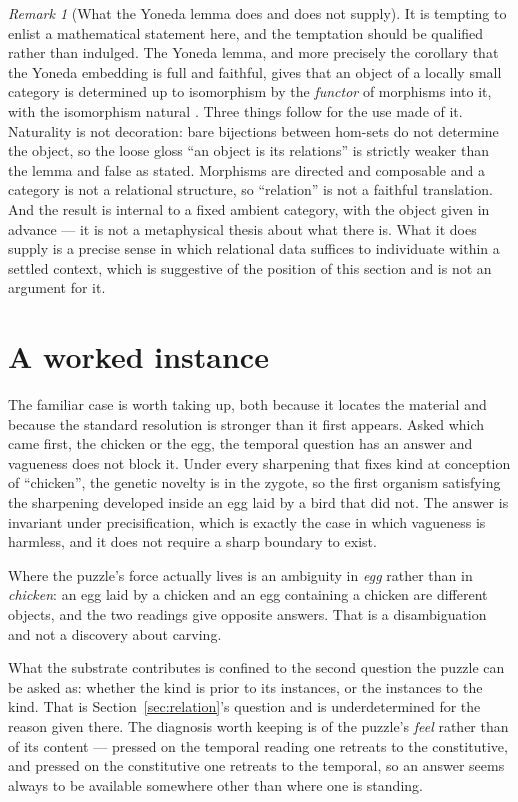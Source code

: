 \documentclass[11pt,a4paper]{article}
\theoremstyle{remark}\newtheorem{remark}[definition]{Remark}
\begin{document}
\begin{remark}[What the Yoneda lemma does and does not supply]\label{rem:yoneda}
It is tempting to enlist a mathematical statement here, and the temptation should be qualified rather
than indulged. The Yoneda lemma, and more precisely the corollary that the Yoneda embedding is full
and faithful, gives that an object of a locally small category is determined up to isomorphism by the
\emph{functor} of morphisms into it, with the isomorphism natural \citep[\S III.2]{maclane1971}. Three
things follow for the use made of it. Naturality is not decoration: bare bijections between hom-sets
do not determine the object, so the loose gloss ``an object is its relations'' is strictly weaker
than the lemma and false as stated. Morphisms are directed and composable and a category is not a
relational structure, so ``relation'' is not a faithful translation. And the result is internal to a
fixed ambient category, with the object given in advance --- it is not a metaphysical thesis about
what there is. What it does supply is a precise sense in which relational data suffices to
individuate within a settled context, which is suggestive of the position of this section and is not
an argument for it.
\end{remark}

\section{A worked instance}\label{sec:chicken}

The familiar case is worth taking up, both because it locates the material and because the standard resolution is stronger than it first appears. Asked which came first, the chicken or the egg, the temporal question has an answer and vagueness
does not block it. Under every sharpening that fixes kind at conception of ``chicken'', the genetic novelty is in the
zygote, so the first organism satisfying the sharpening developed inside an egg laid by a bird that
did not. The answer is invariant under precisification, which is exactly the case in which vagueness
is harmless, and it does not require a sharp boundary to exist.

Where the puzzle's force actually lives is an ambiguity in \emph{egg} rather than in \emph{chicken}:
an egg laid by a chicken and an egg containing a chicken are different objects, and the two readings
give opposite answers. That is a disambiguation and not a discovery about carving.

What the substrate contributes is confined to the second question the puzzle can be asked as: whether
the kind is prior to its instances, or the instances to the kind. That is Section~\ref{sec:relation}'s
question and is underdetermined for the reason given there. The diagnosis worth keeping is of the
puzzle's \emph{feel} rather than of its content --- pressed on the temporal reading one retreats to
the constitutive, and pressed on the constitutive one retreats to the temporal, so an answer seems
always to be available somewhere other than where one is standing.
\end{document}
